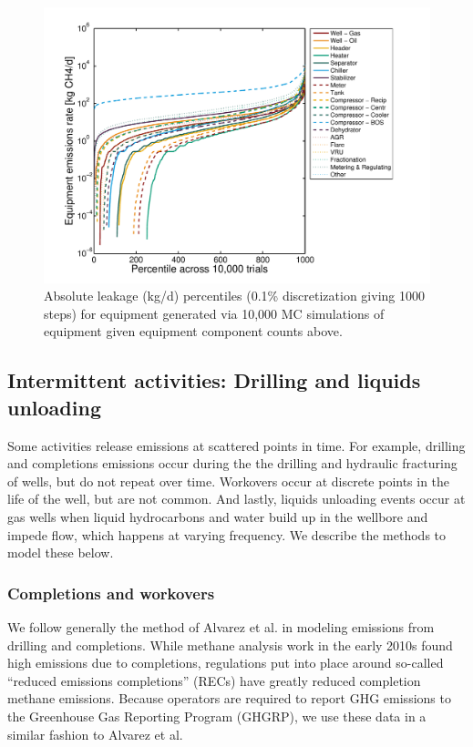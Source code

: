 \documentclass[11pt]{report}
\begin{document}
\begin{figure}[]
\includegraphics[width=1\columnwidth]{images/VF_Component_PercentilesEquip.pdf}
\caption{Absolute leakage (kg/d) percentiles (0.1\% discretization giving 1000 steps)  for equipment generated via 10,000 MC simulations of equipment given equipment component counts above.}
\label{fig:Equipment_Percentiles}
\end{figure}



\clearpage

\subsection{Intermittent activities: Drilling and liquids unloading}

Some activities release emissions at scattered points  in time. For example, drilling and completions emissions occur during the the drilling and hydraulic fracturing of wells, but do not repeat over time. Workovers occur at discrete points in the life of the well, but are not common.  And lastly, liquids unloading events occur at gas wells when liquid hydrocarbons and water build up in the wellbore and impede flow, which happens at varying frequency. We describe the methods to model these below.

\subsubsection{Completions and workovers}

We follow generally the method of Alvarez et al. \cite{Alvarez2018} in modeling emissions from drilling and completions. While methane analysis work in the early 2010s found high emissions due to completions, regulations put into place around so-called ``reduced emissions completions'' (RECs) have greatly reduced completion methane emissions. Because operators are required to report GHG emissions to the Greenhouse Gas Reporting Program (GHGRP), we use these data in a similar fashion to Alvarez et al.
\end{document}
